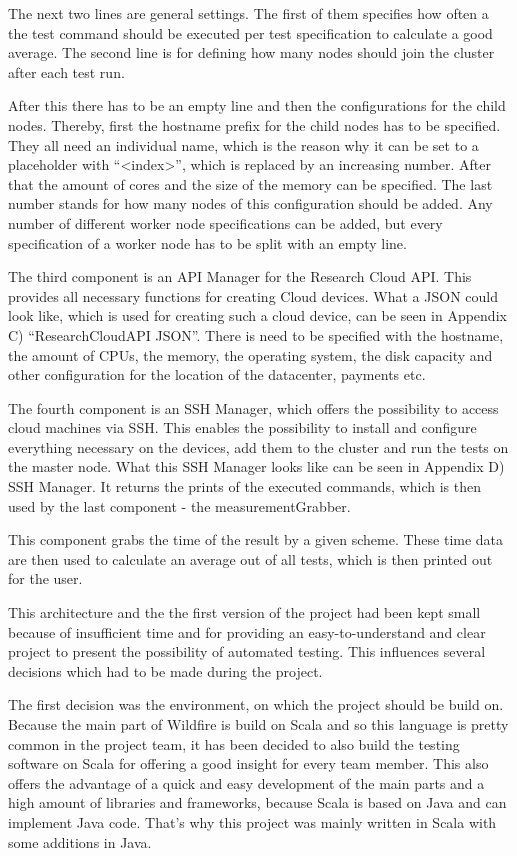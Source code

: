 The next two lines are general settings. The first of them specifies how often a the test command should be executed per test specification to calculate a good average. The second line is for defining how many nodes should join the cluster after each test run.

After this there has to be an empty line and then the configurations for the child nodes. Thereby, first the hostname prefix for the child nodes has to be specified. They all need an individual name, which is the reason why it can be set to a placeholder with ``<index>'', which is replaced by an increasing number. After that the amount of cores and the size of the memory can be specified. The last number stands for how many nodes of this configuration should be added. Any number of different worker node specifications can be added, but every specification of a worker node has to be split with an empty line.

The third component is an API Manager for the Research Cloud API. This provides all necessary functions for creating Cloud devices. What a JSON could look like, which is used for creating such a cloud device, can be seen in Appendix C) ``ResearchCloudAPI JSON''. There is need to be specified with the hostname, the amount of CPUs, the memory, the operating system, the disk capacity and other configuration for the location of the datacenter, payments etc.

The fourth component is an SSH Manager, which offers the possibility to access cloud machines via SSH. This enables the possibility to install and configure everything necessary on the devices, add them to the cluster and run the tests on the master node. What this SSH Manager looks like can be seen in Appendix D) SSH Manager. It returns the prints of the executed commands, which is then used by the last component - the measurementGrabber.

This component grabs the time of the result by a given scheme. These time data are then used to calculate an average out of all tests, which is then printed out for the user.

This architecture and the the first version of the project had been kept small because of insufficient time and for providing an easy-to-understand and clear project to present the possibility of automated testing. This influences several decisions which had to be made during the project.

The first decision was the environment, on which the project should be build on. Because the main part of Wildfire is build on Scala and so this language is pretty common in the project team, it has been decided to also build the testing software on Scala for offering a good insight for every team member. This also offers the advantage of a quick and easy development of the main parts and a high amount of libraries and frameworks, because Scala is based on Java and can implement Java code. That's why this project was mainly written in Scala with some additions in Java.

